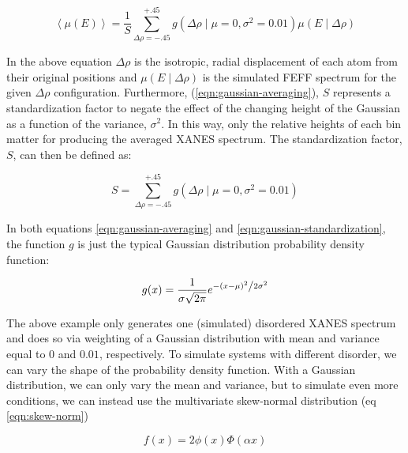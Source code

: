 \begin{equation}
	\label{eqn:gaussian-averaging}
	\left\langle \mu(E) \right\rangle  = \frac{1}{S} \sum_{\Delta\rho=-.45}^{+.45} g\left(\Delta \rho \mid \mu=0, \sigma^2=0.01\right) \mu(E \mid \Delta\rho)
\end{equation}

\noindent
In the above equation $ \Delta\rho $ is the isotropic, radial displacement of each atom from their original positions and $ \mu(E \mid \Delta\rho) $ is the simulated FEFF spectrum for the given $ \Delta\rho $ configuration. Furthermore, (\ref{eqn:gaussian-averaging}), $ S $ represents a standardization factor to negate the effect of the changing height of the Gaussian as a function of the variance, $ \sigma^2 $. In this way, only the relative heights of each bin matter for producing the averaged XANES spectrum. The standardization factor, $ S $, can then be defined as:

\begin{equation}
	\label{eqn:gaussian-standardization}
	S = \sum_{\Delta\rho=-.45}^{+.45} g\left(\Delta \rho \mid \mu=0, \sigma^2=0.01\right)
\end{equation}

\noindent
In both equations \ref{eqn:gaussian-averaging} and \ref{eqn:gaussian-standardization}, the function $ g $ is just the typical Gaussian distribution probability density function: 

\begin{equation}
	\label{eqn:gaussian}
	g(x) = \frac{1}{{\sigma \sqrt {2\pi } }}e^{{{ - \left( {x - \mu } \right)^2 } \mathord{\left/ {\vphantom {{ - \left( {x - \mu } \right)^2 } {2\sigma ^2 }}} \right. \kern-\nulldelimiterspace} {2\sigma ^2 }}}
\end{equation}

The above example only generates one (simulated) disordered XANES spectrum and does so via weighting of a Gaussian distribution with mean and variance equal to $ 0 $ and $ 0.01 $, respectively. To simulate systems with different disorder, we can vary the shape of the probability density function. With a Gaussian distribution, we can only vary the mean and variance, but to simulate even more conditions, we can instead use the multivariate skew-normal distribution (eq \ref{eqn:skew-norm}) \cite{skewnorm_Azzalini_1999, 2020SciPy-NMeth}

\begin{equation}
	\label{eqn:skew-norm}
	f(x)=2\phi (x)\Phi (\alpha x)
\end{equation}
 
